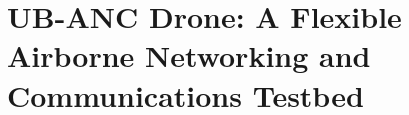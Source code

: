 \chapter{UB-ANC Drone: A Flexible Airborne Networking and Communications Testbed}\label{chap:drone}



